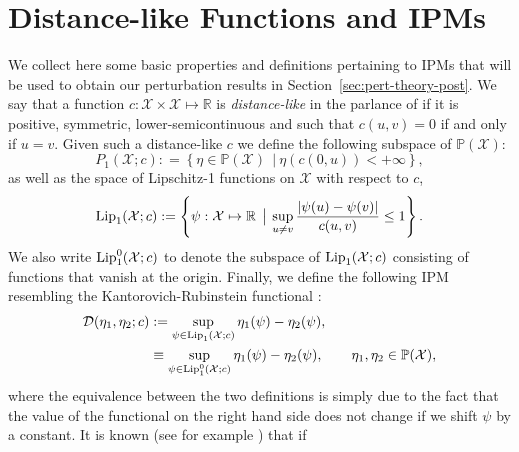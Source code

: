 \documentclass[final]{siamart171218}
\newcommand{\mcl}{\mathcal}
\newcommand{\mbb}{\mathbb}
\newcommand{\dd}{\text{d}}
\newcommand{\Lip}{{\rm Lip}_1}
\newcommand{\mX}{\mcl{X}}
\newcommand{\PP}{\mbb{P}}
\newcommand{\cc}{c}
\newcommand{\D}{\mathcal{D}}
\newcommand{\Sep}{\:\: \big| \:}
\begin{document}
\section{Distance-like Functions and IPMs}\label{sec:prelims}
We collect here some basic properties and definitions pertaining to IPMs that will be used to obtain our perturbation results in Section~\ref{sec:pert-theory-post}.  We say that a function $\cc: \mX \times \mX \mapsto \mbb{R}$ is
{\it distance-like}  in the parlance of  \cite{hairer2011asymptotic} if 
it is positive, symmetric, lower-semicontinuous and such that $\cc(u,v) = 0$ if and only 
if $u =v$. Given such a distance-like  $\cc$ we define the
following subspace of 
$\PP(\mX)$:
\begin{equation*}
  P_1(\mX; c) : = \left\{ \eta \in \PP(\mX) \Sep \eta(  \cc(0, u) )  < +\infty  \right\}, 
\end{equation*}
as well as  the space of Lipschitz-1 functions on $\mX$ with respect to $\cc$,
\begin{equation*}
  \Lip(\mX; \cc) := \left\{  \psi: \mX \mapsto \mbb{R} \Sep \sup_{u\neq v}
    \frac{|\psi(u) - \psi(v)| }{\cc(u,v)} \le 1 \right\}.
\end{equation*}
We also write $\Lip^0(\mX; \cc)$ to denote the subspace of $\Lip(\mX; \cc)$ consisting of
functions that vanish at the origin. 
Finally, we define the following IPM resembling the Kantorovich-Rubinstein
functional \cite{bogachev2012monge}:
\begin{equation}\label{d-KR}
  \begin{aligned}
  \D(\eta_1, \eta_2; \cc) & :=   %
  \sup_{\psi \in \Lip(\mX ; \cc)}  \eta_1( \psi) -  \eta_2( \psi),\\
  & \equiv \sup_{\psi \in \Lip^0(\mX ; \cc)}  \eta_1( \psi) -  \eta_2( \psi), \qquad \eta_1, \eta_2 \in \PP(\mX),
\end{aligned}
\end{equation}
where the equivalence between the two definitions is simply due to the fact that 
the value of the functional on the right hand side does not change if we 
shift $\psi$ by a constant.
It is known (see for example \cite[Particular Case 5.4]{villani-OT}) that if
\end{document}
